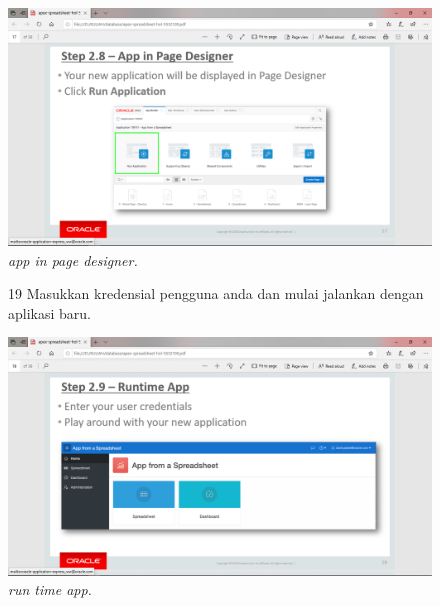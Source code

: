 \begin{enumerate}
\begin{figure}
    \begin{center}
\includegraphics[scale=0.3]{figures/pic(11).png}
    \caption{\textit{app in page designer.}}
        \end{center}
\label{gambar}
\end{figure}


\begin{figure}
\item[19] Masukkan kredensial pengguna anda dan mulai jalankan dengan aplikasi baru.

    \begin{center}
\includegraphics[scale=0.3]{figures/pic(12).png}
    \caption{\textit{run time app.}}
        \end{center}
\label{gambar}
\end{figure}


\end{enumerate}

